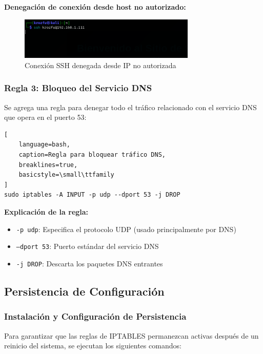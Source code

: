 \documentclass[12pt,a4paper]{article}
\begin{document}
\textbf{Denegación de conexión desde host no autorizado:}

\begin{figure}[H]
  \centering
  \includegraphics[width=0.75\textwidth]{./assets/img10.png}
  \caption{Conexión SSH denegada desde IP no autorizada}
  \label{fig:ssh-denied}
\end{figure}

\subsubsection{Regla 3: Bloqueo del Servicio DNS}

Se agrega una regla para denegar todo el tráfico relacionado con el servicio
DNS que opera en el puerto 53:

\begin{lstlisting}[
    language=bash, 
    caption=Regla para bloquear tráfico DNS,
    breaklines=true,
    basicstyle=\small\ttfamily
]
sudo iptables -A INPUT -p udp --dport 53 -j DROP
\end{lstlisting}

\textbf{Explicación de la regla:}
\begin{itemize}
  \item \texttt{-p udp}: Especifica el protocolo UDP (usado principalmente por DNS)
  \item \texttt{--dport 53}: Puerto estándar del servicio DNS
  \item \texttt{-j DROP}: Descarta los paquetes DNS entrantes
\end{itemize}

\subsection{Persistencia de Configuración}

\subsubsection{Instalación y Configuración de Persistencia}

Para garantizar que las reglas de IPTABLES permanezcan activas después de un
reinicio del sistema, se ejecutan los siguientes comandos:
\end{document}

